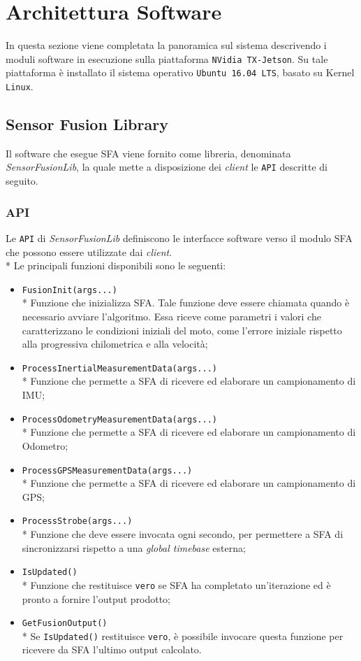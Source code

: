 \section{Architettura Software}
In questa sezione viene completata la panoramica sul sistema descrivendo i moduli software in esecuzione sulla piattaforma \texttt{NVidia TX-Jetson}. Su tale piattaforma  \`e installato il sistema operativo \texttt{Ubuntu 16.04 LTS}, basato su Kernel \texttt{Linux}.
\subsection{Sensor Fusion Library}
Il software che esegue SFA viene fornito come libreria, denominata \textit{SensorFusionLib}, la quale mette a disposizione dei \emph{client} le \texttt{API} descritte di seguito.
\subsubsection{API}
Le \texttt{API} di \emph{SensorFusionLib} definiscono le interfacce software verso il modulo SFA che possono essere utilizzate dai \emph{client}.\\*
Le principali funzioni disponibili sono le seguenti:
\begin{itemize}
	\item \texttt{FusionInit(args...)}\\*
	Funzione che inizializza SFA. Tale funzione deve essere chiamata quando \`e necessario avviare l'algoritmo. Essa riceve come parametri i valori che caratterizzano le condizioni iniziali del moto, come l'errore iniziale rispetto alla progressiva chilometrica e alla velocit\`a;
	\item \texttt{ProcessInertialMeasurementData(args...)}\\*
	Funzione che permette a SFA di ricevere ed elaborare un campionamento di IMU; 
	\item \texttt{ProcessOdometryMeasurementData(args...)}\\*
	Funzione che permette a SFA di ricevere ed elaborare un campionamento di Odometro;
	\item \texttt{ProcessGPSMeasurementData(args...)}\\*
	Funzione che permette a SFA di ricevere ed elaborare un campionamento di GPS;
	\item \texttt{ProcessStrobe(args...)}\\*
	Funzione che deve essere invocata ogni secondo, per permettere a SFA di sincronizzarsi rispetto a una \emph{global timebase} esterna; \cite{clock}
	\item 
	\texttt{IsUpdated()}\\*
	Funzione che restituisce \texttt{vero} se SFA ha completato un'iterazione ed \`e pronto a fornire l'output prodotto;
	\item \texttt{GetFusionOutput()}\\*
	Se \texttt{IsUpdated()} restituisce \texttt{vero}, \`e possibile invocare questa funzione per ricevere da SFA l'ultimo output calcolato.
\end{itemize}

